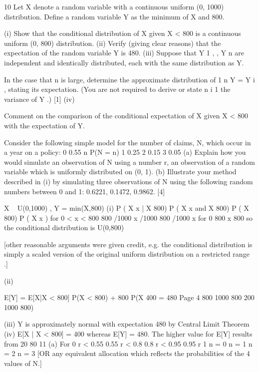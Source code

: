 \documentclass[a4paper,12pt]{article}
\begin{document}
10
Let X denote a random variable with a continuous uniform (0, 1000) distribution.
Define a random variable Y as the minimum of X and 800.

(i) Show that the conditional distribution of X given X < 800 is a continuous uniform (0, 800) distribution.
(ii) Verify (giving clear reasons) that the expectation of the random variable Y is 480.
(iii) Suppose that Y 1 , , Y n are independent and identically distributed, each with the same distribution as Y.

In the case that n is large, determine the approximate distribution of
1 n
Y =
Y i , stating its expectation. (You are not required to derive or state
n i 1
the variance of Y .)
[1]
(iv)

Comment on the comparison of the conditional expectation of X given X < 800
with the expectation of Y.

Consider the following simple model for the number of claims, N, which occur in a
year on a policy:
0
0.55
n
P(N = n)
1
0.25
2
0.15
3
0.05
(a) Explain how you would simulate an observation of N using a number r, an
observation of a random variable which is uniformly distributed on (0, 1).
(b) Illustrate your method described in (i) by simulating three observations of N
using the following random numbers between 0 and 1:
0.6221, 0.1472, 0.9862.
[4]

X ~ U(0,1000) , Y = min(X,800)
(i)
P ( X
x | X
800)
P ( X
x and X 800)
P ( X 800)
P ( X x )
for 0 < x < 800
800 /1000
x /1000
800 /1000
x
for 0
800
x 800
so the conditional distribution is U(0,800)

[other reasonable arguments were given credit, e.g. the conditional distribution is simply a scaled version of the original uniform distribution on a restricted range .]


(ii)

E[Y] = E[X|X < 800] P(X < 800) + 800 P(X
400
= 480
Page 4
800
1000
800
200
1000
800)

(iii) Y is approximately normal with expectation 480 by Central Limit Theorem
(iv) E[X | X < 800] = 400 whereas E[Y] = 480.
The higher value for E[Y] results from 20%
80%
11
(a)
For 0 r < 0.55
0.55 r < 0.8
0.8 r < 0.95
0.95 r 1
n = 0
n = 1
n = 2
n = 3
[OR any equivalent allocation which reflects the probabilities of the 4 values
of N.]
\end{document}
